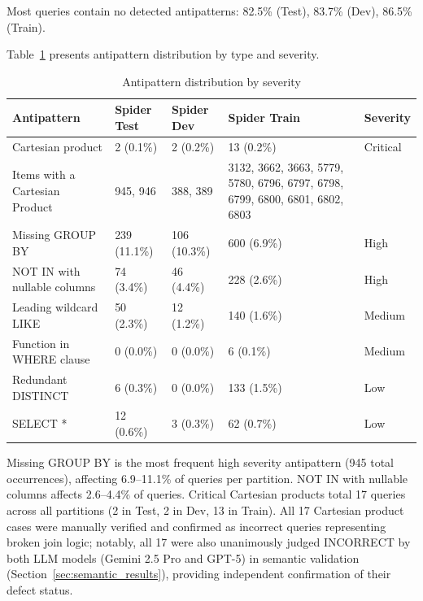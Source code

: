 \documentclass[print]{einformatica}
\begin{document}
Most queries contain no detected antipatterns: 82.5\% (Test), 83.7\% (Dev), 86.5\% (Train).

Table~\ref{tab:antipatterns_top5} presents antipattern distribution by type and severity.

\begin{table}[ht]
    \caption{Antipattern distribution by severity}
    \label{tab:antipatterns_top5}
    \centering
    \footnotesize
    \begin{tabular}{lp{}p{}p{}l}
        \toprule
        \textbf{Antipattern} & \textbf{Spider Test} & \textbf{Spider Dev} & \textbf{Spider Train} & \textbf{Severity} \\
        \midrule
        Cartesian product & 2 (0.1\%) & 2 (0.2\%) & 13 (0.2\%) & Critical \\
        Items with a Cartesian Product & 945, 946 & 388, 389 & 3132, 3662, 3663, 5779, 5780, 6796, 6797, 6798, 6799, 6800, 6801, 6802, 6803 & \\
        Missing GROUP BY & 239 (11.1\%) & 106 (10.3\%) & 600 (6.9\%) & High \\
        NOT IN with nullable columns & 74 (3.4\%) & 46 (4.4\%) & 228 (2.6\%) & High \\
        Leading wildcard LIKE & 50 (2.3\%) & 12 (1.2\%) & 140 (1.6\%) & Medium \\
        Function in WHERE clause & 0 (0.0\%) & 0 (0.0\%) & 6 (0.1\%) & Medium \\
        Redundant DISTINCT & 6 (0.3\%) & 0 (0.0\%) & 133 (1.5\%) & Low \\
        SELECT * & 12 (0.6\%) & 3 (0.3\%) & 62 (0.7\%) & Low \\
        \bottomrule
    \end{tabular}
\end{table}

Missing GROUP BY is the most frequent high severity antipattern (945 total occurrences), affecting 6.9--11.1\% of queries per partition. NOT IN with nullable columns affects 2.6--4.4\% of queries. Critical Cartesian products total 17 queries across all partitions (2 in Test, 2 in Dev, 13 in Train). All 17 Cartesian product cases were manually verified and confirmed as incorrect queries representing broken join logic; notably, all 17 were also unanimously judged INCORRECT by both LLM models (Gemini 2.5 Pro and GPT-5) in semantic validation (Section~\ref{sec:semantic_results}), providing independent confirmation of their defect status.
\end{document}
